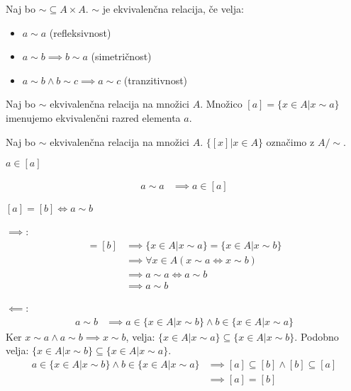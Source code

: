 \begin{definicija}
    Naj bo $\sim \subseteq A \times A$. $\sim$ je ekvivalenčna relacija, če velja:
    \begin{itemize}
        \item $a\sim a$ (refleksivnost)
        \item $a\sim b \implies b\sim a$ (simetričnost)
        \item $a\sim b \wedge b\sim c \implies a\sim c$ (tranzitivnost)
    \end{itemize}
\end{definicija}

\begin{definicija}
    Naj bo $\sim$ ekvivalenčna relacija na množici $A$.
    Množico $[a] = \{x \in A | x \sim a\}$ imenujemo ekvivalenčni razred elementa $a$.
\end{definicija}

\begin{definicija}
    Naj bo $\sim$ ekvivalenčna relacija na množici $A$.
    $\{[x] | x \in A\}$ označimo z $A/\sim$.
\end{definicija}

\begin{trditev}
    $a \in [a]$
\end{trditev}
\begin{dokaz}
\begin{align*}
    a\sim a &\implies a \in [a]
\end{align*}
\end{dokaz}

\begin{trditev}
    $[a] = [b] \iff a\sim b$
\end{trditev}
\begin{dokaz}
$\implies$:
\begin{align*}
    [a] = [b] &\implies \{x \in A | x \sim a\} = \{x \in A | x \sim b\} \\
    &\implies \forall x \in A(x \sim a \iff x \sim b) \\
    &\implies a \sim a \iff a \sim b \\
    &\implies a\sim b
\end{align*}
\end{dokaz}

$\impliedby$:
\begin{align*}
    a\sim b &\implies a \in \{x \in A | x \sim b\} \wedge b \in \{x \in A | x \sim a\}
\end{align*}
Ker $x \sim a \wedge a \sim b \implies x \sim b$, velja: $\{x \in A | x \sim a\} \subseteq \{x \in A | x \sim b\}$.
Podobno velja: $\{x \in A | x \sim b\} \subseteq \{x \in A | x \sim a\}$.
\begin{align*}
    a \in \{x \in A | x \sim b\} \wedge b \in \{x \in A | x \sim a\} &\implies [a] \subseteq [b] \wedge [b] \subseteq [a] \\
    &\implies [a] = [b]
\end{align*}

